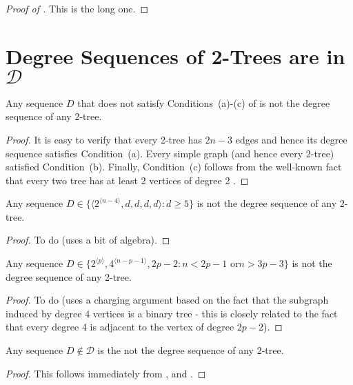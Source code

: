 \documentclass[lotsofwhite,charterfonts]{patmorin}
\newcommand{\rep}[1]{^{\langle#1\rangle}}
\begin{document}
\begin{proof}[Proof of ]
This is the long one.
\end{proof}


\section{Degree Sequences of 2-Trees are in $\mathcal{D}$}

\begin{lem}
Any sequence $D$ that does not satisfy Conditions~(a)-(c) of
 is not the degree sequence of any 2-tree.
\end{lem}

\begin{proof}
It is easy to verify that every 2-tree has $2n-3$ edges and hence
its degree sequence satisfies Condition~(a).
Every simple graph (and hence every 2-tree) satisfied Condition~(b).
Finally, Condition~(c) follows from the 
well-known fact that every two tree has at least 2 vertices of degree
2 \cite{X}.
\end{proof}

\begin{lem}
Any sequence $D\in\{\langle 2\rep{n-4},d,d,d,d\rangle : d\ge 5\}$ is not 
the degree sequence of any 2-tree.
\end{lem}

\begin{proof}
To do (uses a bit of algebra).
\end{proof}


\begin{lem}
Any sequence $D\in\{2\rep{p},4\rep{n-p-1}, 2p-2 : \mbox{$n < 2p-1$ or
$n > 3p-3$} \}$ is not the degree sequence of any 2-tree.
\end{lem}

\begin{proof}
To do (uses a charging argument based on the fact that the subgraph
induced by degree 4 vertices is a binary tree - this is closely
related to the fact that every degree 4 is adjacent to the vertex of
degree $2p-2$).
\end{proof}

\begin{lem}
Any sequence $D\not\in \mathcal{D}$ is the not the degree sequence of
any 2-tree.
\end{lem}

\begin{proof}
This follows immediately from ,  and
.
\end{proof}
\end{document}
